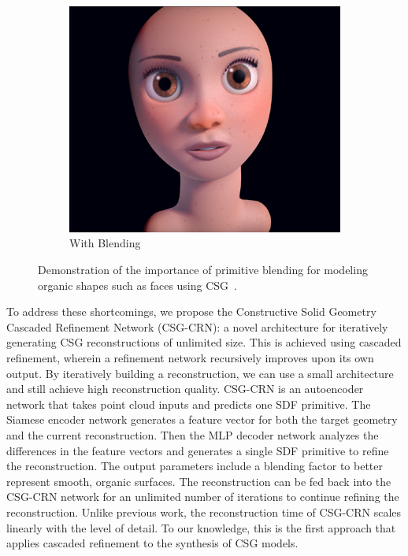 \begin{figure}[!b]
\begin{subfigure}[t]{0.45\textwidth}
		\includegraphics[width=\textwidth]{Images/Face with blending}
		\caption{With Blending}
	\end{subfigure}
	\caption{Demonstration of the importance of primitive blending for modeling organic shapes such as faces using CSG~\cite{Quilez2013}.}
	\label{fig:primitive_blending}
\end{figure}

To address these shortcomings, we propose the Constructive Solid Geometry Cascaded Refinement Network (CSG-CRN): a novel architecture for iteratively generating CSG reconstructions of unlimited size. This is achieved using cascaded refinement, wherein a refinement network recursively improves upon its own output. By iteratively building a reconstruction, we can use a small architecture and still achieve high reconstruction quality. CSG-CRN is an autoencoder network that takes point cloud inputs and predicts one SDF primitive. The Siamese encoder network generates a feature vector for both the target geometry and the current reconstruction. Then the MLP decoder network analyzes the differences in the feature vectors and generates a single SDF primitive to refine the reconstruction. The output parameters include a blending factor to better represent smooth, organic surfaces. The reconstruction can be fed back into the CSG-CRN network for an unlimited number of iterations to continue refining the reconstruction. Unlike previous work, the reconstruction time of CSG-CRN scales linearly with the level of detail. To our knowledge, this is the first approach that applies cascaded refinement to the synthesis of CSG models.

